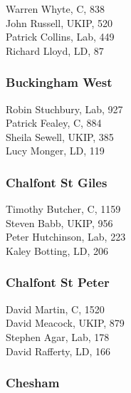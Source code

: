 \documentclass[a4paper,openany,10pt]{book}
\begin{document}


Warren Whyte, C, 838\\
John Russell, UKIP, 520\\
Patrick Collins, Lab, 449\\
Richard Lloyd, LD, 87\\


\subsubsection*{Buckingham West}



Robin Stuchbury, Lab, 927\\
Patrick Fealey, C, 884\\
Sheila Sewell, UKIP, 385\\
Lucy Monger, LD, 119\\


\subsubsection*{Chalfont St Giles}



Timothy Butcher, C, 1159\\
Steven Babb, UKIP, 956\\
Peter Hutchinson, Lab, 223\\
Kaley Botting, LD, 206\\


\subsubsection*{Chalfont St Peter}



David Martin, C, 1520\\
David Meacock, UKIP, 879\\
Stephen Agar, Lab, 178\\
David Rafferty, LD, 166\\


\subsubsection*{Chesham}
\end{document}
